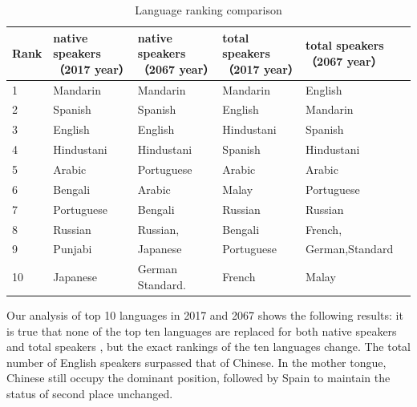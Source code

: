 \begin{table}[H]
	\centering
	\caption{Language ranking comparison}
	\begin{tabular}{l p{2.8cm}p{2.8cm}p{2.8cm}p{3.2cm}}
		\toprule
		\multicolumn{1}{l}{Rank} & native speakers（2017 year） & native speakers（2067 year） & total speakers（2017 year） & total speakers（2067 year） \\
		\midrule
		1     & Mandarin & Mandarin & Mandarin & English \\
		2     & Spanish & Spanish & English & Mandarin \\
		3     & English & English & Hindustani & Spanish \\
		4     & Hindustani & Hindustani & Spanish & Hindustani \\
		5     & Arabic & Portuguese & Arabic & Arabic \\
		6     & Bengali & Arabic & Malay & Portuguese \\
		7     & Portuguese & Bengali & Russian & Russian \\
		8     & Russian & Russian, & Bengali & French, \\
		9     & Punjabi & Japanese & Portuguese & German,Standard \\
		10    & Japanese & German Standard. & French & Malay \\
		\bottomrule
	\end{tabular}%
	\label{tab:Language}%
\end{table}%

Our analysis of top 10 languages in 2017 and 2067 shows the following results: it is true that none of the top ten languages are replaced for both native speakers and total speakers , but the exact rankings of the ten languages change. The total number of English speakers surpassed that of Chinese. In the mother tongue, Chinese still occupy the dominant position, followed by Spain to maintain the status of second place unchanged.

